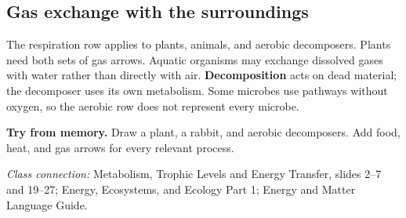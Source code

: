 \documentclass[11pt,letterpaper]{article}
\newcommand{\memorycheck}[1]{\par\smallskip\textbf{Try from memory.} #1\par}
\newcommand{\ico}[3][forest]{{\fontsize{#3}{#3}\selectfont\textcolor{#1}{#2}}}
\newcommand{\classsource}[1]{{\footnotesize\textit{Class connection:} #1\par}}
\begin{document}
\subsection*{Gas exchange with the surroundings}
\begin{center}
\par
\end{center}
The respiration row applies to plants, animals, and aerobic decomposers. Plants need both sets of gas arrows. Aquatic organisms may exchange dissolved gases with water rather than directly with air.
\textbf{Decomposition} acts on dead material; the decomposer uses its own metabolism. Some microbes use pathways without oxygen, so the aerobic row does not represent every microbe.
\memorycheck{Draw a plant, a rabbit, and aerobic decomposers. Add food, heat, and gas arrows for every relevant process.}
\classsource{Metabolism, Trophic Levels and Energy Transfer, slides 2--7 and 19--27; Energy, Ecosystems, and Ecology Part 1; Energy and Matter Language Guide.}
\end{document}
